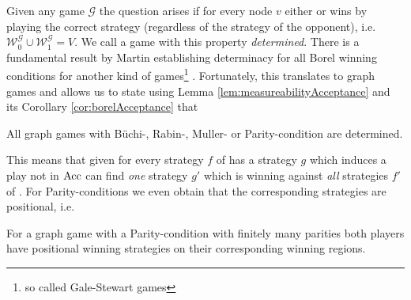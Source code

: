 Given any game $\mathcal{G}$ the question arises if for every node $v$ either
\eve{} or \adam{} wins by playing the correct strategy (regardless of
the strategy of the opponent), i.e. 
$\mathcal{W}^{\mathcal{G}}_{0}\cup\mathcal{W}^{\mathcal{G}}_{1} = V$. We call
a game with this property \emph{determined}. There is a fundamental result by
Martin establishing determinacy for all Borel winning conditions for another 
kind of games\footnote{so called Gale-Stewart games} \cite{BorelDeterminacy}. 
Fortunately, this translates to graph games and allows us to state using Lemma 
\ref{lem:measureabilityAcceptance} and its Corollary \ref{cor:borelAcceptance}
that
\begin{theorem}
  \cite[Corollary 2.10]{AutoLogInfGames}
  All graph games with Büchi-, Rabin-, Muller- or Parity-condition are 
  determined.
  \label{thm:boreldet}
\end{theorem}
This means that given for every strategy $f$ of \eve{} \adam{} has a strategy
$g$ which induces a play not in $\operatorname{Acc}$ \adam{} can find \emph{one} strategy
$g'$ which is winning against \emph{all} strategies $f'$ of \eve{}.
For Parity-conditions we even obtain that the corresponding strategies are 
positional, i.e.
\begin{theorem}
  \cite[Theorem 6]{ParityGamesPosDet}
  For a graph game with a Parity-condition with finitely many parities both 
  players have positional winning strategies on their corresponding winning 
  regions.
  \label{thm:posdetparity}
\end{theorem}

